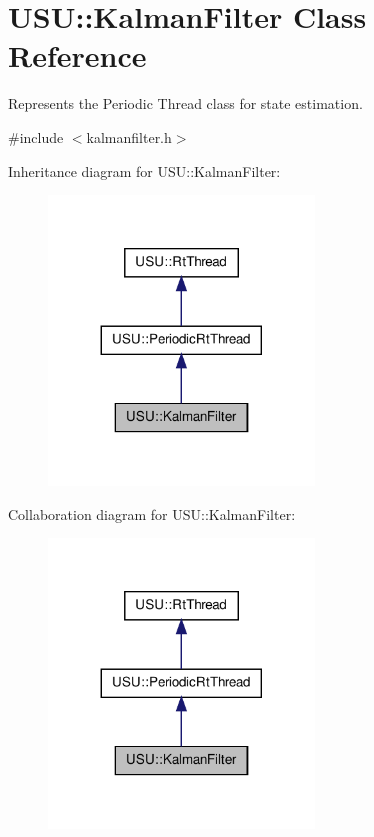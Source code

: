 \hypertarget{class_u_s_u_1_1_kalman_filter}{\section{\-U\-S\-U\-:\-:\-Kalman\-Filter \-Class \-Reference}
\label{class_u_s_u_1_1_kalman_filter}
}


\-Represents the \-Periodic \-Thread class for state estimation.  




{\ttfamily \#include $<$kalmanfilter.\-h$>$}



\-Inheritance diagram for \-U\-S\-U\-:\-:\-Kalman\-Filter\-:\nopagebreak
\begin{figure}[H]
\begin{center}
\leavevmode
\includegraphics[width=200pt]{class_u_s_u_1_1_kalman_filter__inherit__graph}
\end{center}
\end{figure}


\-Collaboration diagram for \-U\-S\-U\-:\-:\-Kalman\-Filter\-:\nopagebreak
\begin{figure}[H]
\begin{center}
\leavevmode
\includegraphics[width=200pt]{class_u_s_u_1_1_kalman_filter__coll__graph}
\end{center}
\end{figure}
